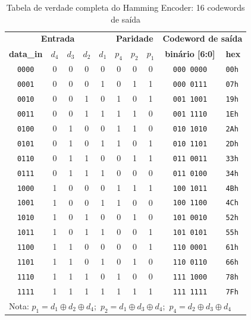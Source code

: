 \documentclass[12pt,a4paper]{article}
\begin{document}
\begin{table}[h!]
\centering
\caption{Tabela de verdade completa do Hamming Encoder: 16 codewords de saída}
\label{tab:truth}
\small
{}
\begin{tabular}{c c c c c | c c c | c l}
\toprule
\multicolumn{5}{c|}{\textbf{Entrada}} & \multicolumn{3}{c|}{\textbf{Paridade}} & \multicolumn{2}{c}{\textbf{Codeword de saída}} \\
\textbf{data\_in} & $d_4$ & $d_3$ & $d_2$ & $d_1$ & $p_4$ & $p_2$ & $p_1$ & \textbf{binário [6:0]} & \textbf{hex} \\
\midrule
\texttt{0000} & 0 & 0 & 0 & 0 & 0 & 0 & 0 & \texttt{000\,0000} & \texttt{00h} \\
\texttt{0001} & 0 & 0 & 0 & 1 & 0 & 1 & 1 & \texttt{000\,0111} & \texttt{07h} \\
\texttt{0010} & 0 & 0 & 1 & 0 & 1 & 0 & 1 & \texttt{001\,1001} & \texttt{19h} \\
\texttt{0011} & 0 & 0 & 1 & 1 & 1 & 1 & 0 & \texttt{001\,1110} & \texttt{1Eh} \\
\texttt{0100} & 0 & 1 & 0 & 0 & 1 & 1 & 0 & \texttt{010\,1010} & \texttt{2Ah} \\
\texttt{0101} & 0 & 1 & 0 & 1 & 1 & 0 & 1 & \texttt{010\,1101} & \texttt{2Dh} \\
\texttt{0110} & 0 & 1 & 1 & 0 & 0 & 1 & 1 & \texttt{011\,0011} & \texttt{33h} \\
\texttt{0111} & 0 & 1 & 1 & 1 & 0 & 0 & 0 & \texttt{011\,0100} & \texttt{34h} \\
\texttt{1000} & 1 & 0 & 0 & 0 & 1 & 1 & 1 & \texttt{100\,1011} & \texttt{4Bh} \\
\texttt{1001} & 1 & 0 & 0 & 1 & 1 & 0 & 0 & \texttt{100\,1100} & \texttt{4Ch} \\
\texttt{1010} & 1 & 0 & 1 & 0 & 0 & 1 & 0 & \texttt{101\,0010} & \texttt{52h} \\
\texttt{1011} & 1 & 0 & 1 & 1 & 0 & 0 & 1 & \texttt{101\,0101} & \texttt{55h} \\
\texttt{1100} & 1 & 1 & 0 & 0 & 0 & 0 & 1 & \texttt{110\,0001} & \texttt{61h} \\
\texttt{1101} & 1 & 1 & 0 & 1 & 0 & 1 & 0 & \texttt{110\,0110} & \texttt{66h} \\
\texttt{1110} & 1 & 1 & 1 & 0 & 1 & 0 & 0 & \texttt{111\,1000} & \texttt{78h} \\
\texttt{1111} & 1 & 1 & 1 & 1 & 1 & 1 & 1 & \texttt{111\,1111} & \texttt{7Fh} \\
\bottomrule
\multicolumn{10}{l}{\small Nota: $p_1 = d_1 \oplus d_2 \oplus d_4$;\ $p_2 = d_1 \oplus d_3 \oplus d_4$;\ $p_4 = d_2 \oplus d_3 \oplus d_4$}
\end{tabular}
\end{table}
\end{document}
